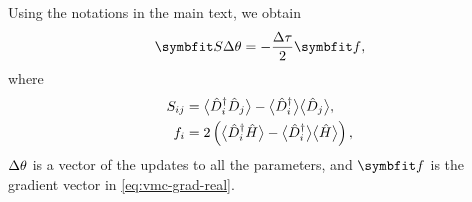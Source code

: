 Using the notations in the main text, we obtain
\begin{equation}
\mS \dth = -\frac{\dta}{2} \vf,
\end{equation}
where
\begin{align}
S_{i j} &= \big\langle \hat{D}^\dagger_i \hat{D}_j \big\rangle - \big\langle \hat{D}^\dagger_i \big\rangle \big\langle \hat{D}_j \big\rangle, \\
f_i &= 2 \left( \big\langle \hat{D}^\dagger_i \hat{H} \big\rangle - \big\langle \hat{D}^\dagger_i \big\rangle \big\langle \hat{H} \big\rangle \right),
\end{align}
${\Delta \theta}$ is a vector of the updates to all the parameters, and $\vf$ is the gradient vector in \cref{eq:vmc-grad-real}.
